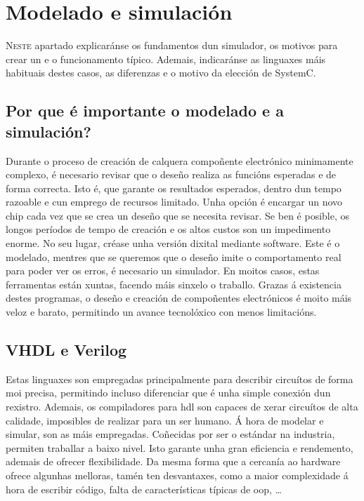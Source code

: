 \chapter{Modelado e simulación}
\label{chap:mod_sim}

\lettrine{N}{este} apartado explicaránse os fundamentos dun simulador, os motivos para crear un e o funcionamento típico. Ademais, indicaránse as linguaxes máis habituais destes casos, as diferenzas e o motivo da elección de SystemC. 

\section{Por que é importante o modelado e a simulación?}\label{sec:mod_sim}
Durante o proceso de creación de calquera compoñente electrónico minimamente complexo, é necesario revisar que o deseño realiza as funcións esperadas e de forma correcta. Isto é, que garante os resultados esperados, dentro dun tempo razoable e cun emprego de recursos limitado. Unha opción é encargar un novo chip cada vez que se crea un deseño que se necesita revisar. Se ben é posible, os longos períodos de tempo de creación e os altos custos son un impedimento enorme. No seu lugar, créase unha versión dixital mediante \gls{software}. Este é o modelado, mentres que se queremos que o deseño imite o comportamento real para poder ver os erros, é necesario un simulador. En moitos casos, estas ferramentas están xuntas, facendo máis sinxelo o traballo.
Grazas á existencia destes programas, o deseño e creación de compoñentes electrónicos é moito máis veloz e barato, permitindo un avance tecnolóxico con menos limitacións.


\section{VHDL e Verilog}\label{sec:vhdl_verilog}
Estas linguaxes son empregadas principalmente para describir circuítos de forma moi precisa, permitindo incluso diferenciar que é unha simple conexión dun rexistro. Ademais, os compiladores para \acrfull{hdl} son capaces de xerar circuítos de alta calidade, imposibles de realizar para un ser humano. Á hora de modelar e simular, son as máis empregadas. Coñecidas por ser o estándar na industria, permiten traballar a baixo nivel. Isto garante unha gran eficiencia e rendemento, ademais de ofrecer flexibilidade. Da mesma forma que a cercanía ao hardware ofrece algunhas melloras, tamén ten desvantaxes, como a maior complexidade á hora de escribir código, falta de características típicas de \acrfull{oop}, \dots

